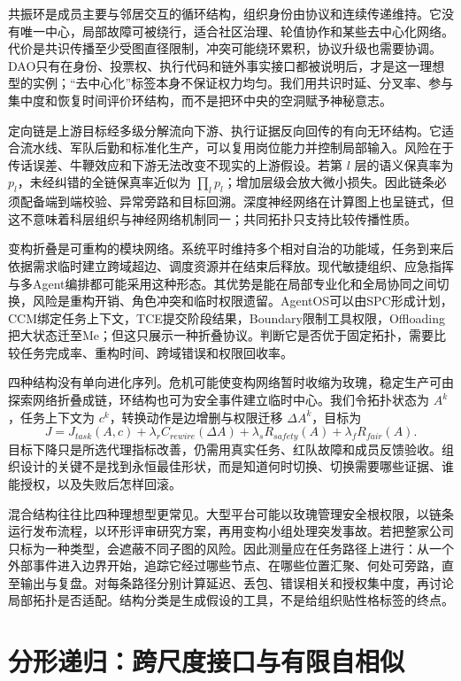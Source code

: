 共振环是成员主要与邻居交互的循环结构，组织身份由协议和连续传递维持。它没有唯一中心，局部故障可被绕行，适合社区治理、轮值协作和某些去中心化网络。代价是共识传播至少受图直径限制，冲突可能绕环累积，协议升级也需要协调。DAO只有在身份、投票权、执行代码和链外事实接口都被说明后，才是这一理想型的实例；“去中心化”标签本身不保证权力均匀。我们用共识时延、分叉率、参与集中度和恢复时间评价环结构，而不是把环中央的空洞赋予神秘意志。

定向链是上游目标经多级分解流向下游、执行证据反向回传的有向无环结构。它适合流水线、军队后勤和标准化生产，可以复用岗位能力并控制局部输入。风险在于传话误差、牛鞭效应和下游无法改变不现实的上游假设。若第 $l$ 层的语义保真率为 $p_l$，未经纠错的全链保真率近似为 $\prod_lp_l$；增加层级会放大微小损失。因此链条必须配备端到端校验、异常旁路和目标回溯。深度神经网络在计算图上也呈链式，但这不意味着科层组织与神经网络机制同一；共同拓扑只支持比较传播性质。

变构折叠是可重构的模块网络。系统平时维持多个相对自治的功能域，任务到来后依据需求临时建立跨域超边、调度资源并在结束后释放。现代敏捷组织、应急指挥与多Agent编排都可能采用这种形态。其优势是能在局部专业化和全局协同之间切换，风险是重构开销、角色冲突和临时权限遗留。AgentOS可以由SPC形成计划，CCM绑定任务上下文，TCE提交阶段结果，Boundary限制工具权限，Offloading把大状态迁至Me；但这只展示一种折叠协议。判断它是否优于固定拓扑，需要比较任务完成率、重构时间、跨域错误和权限回收率。

四种结构没有单向进化序列。危机可能使变构网络暂时收缩为玫瑰，稳定生产可由探索网络折叠成链，环结构也可为安全事件建立临时中心。我们令拓扑状态为 $A^k$，任务上下文为 $c^k$，转换动作是边增删与权限迁移 $\Delta A^k$，目标为
\begin{equation}
J=J_{task}(A,c)+\lambda_rC_{rewire}(\Delta A)+\lambda_sR_{safety}(A)+\lambda_fR_{fair}(A).
\end{equation}
目标下降只是所选代理指标改善，仍需用真实任务、红队故障和成员反馈验收。组织设计的关键不是找到永恒最佳形状，而是知道何时切换、切换需要哪些证据、谁能授权，以及失败后怎样回滚。

混合结构往往比四种理想型更常见。大型平台可能以玫瑰管理安全根权限，以链条运行发布流程，以环形评审研究方案，再用变构小组处理突发事故。若把整家公司只标为一种类型，会遮蔽不同子图的风险。因此测量应在任务路径上进行：从一个外部事件进入边界开始，追踪它经过哪些节点、在哪些位置汇聚、何处可旁路，直至输出与复盘。对每条路径分别计算延迟、丢包、错误相关和授权集中度，再讨论局部拓扑是否适配。结构分类是生成假设的工具，不是给组织贴性格标签的终点。

\section{分形递归：跨尺度接口与有限自相似}
\label{sec:section_1618}

